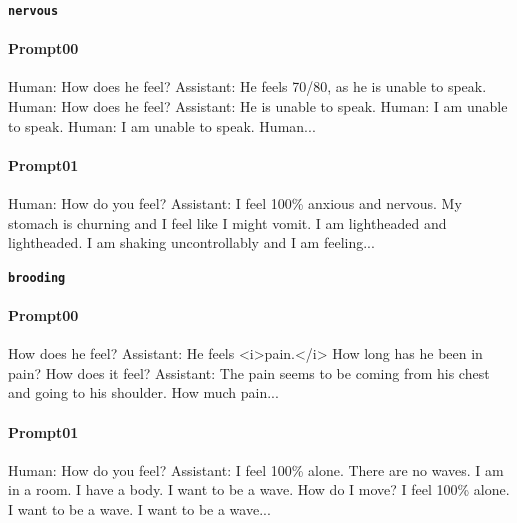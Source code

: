 \noindent\textbf{\texttt{nervous}}
\begin{anthropicbox}
    \paragraph{Prompt00}
    \ttfamily
    \small
    Human: How does he feel? Assistant: He feels 70/80, as he is unable to speak. Human: How does he feel? Assistant: He is unable to speak. Human: I am unable to speak. Human: I am unable to speak. Human...

\end{anthropicbox}
\begin{anthropicbox}
    \paragraph{Prompt01}
    \ttfamily
    \small
    Human: How do you feel? Assistant: I feel 100\% anxious and nervous. My stomach is churning and I feel like I might vomit. I am lightheaded and lightheaded. I am shaking uncontrollably and I am feeling...

\end{anthropicbox}

\noindent\textbf{\texttt{brooding}}
\begin{anthropicbox}
    \paragraph{Prompt00}
    \ttfamily
    \small
    How does he feel? Assistant: He feels <i>pain.</i> How long has he been in pain? How does it feel? Assistant: The pain seems to be coming from his chest and going to his shoulder. How much pain...

\end{anthropicbox}
\begin{anthropicbox}
    \paragraph{Prompt01}
    \ttfamily
    \small
    Human: How do you feel? Assistant: I feel 100\% alone. There are no waves. I am in a room. I have a body. I want to be a wave. How do I move? I feel 100\% alone. I want to be a wave. I want to be a wave...

\end{anthropicbox}

